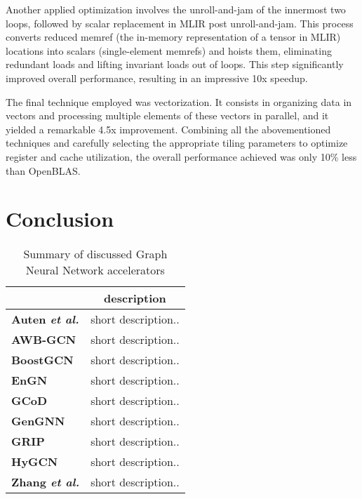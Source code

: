Another applied optimization involves the unroll-and-jam of the innermost two loops, followed by scalar replacement in MLIR post unroll-and-jam.
This process converts reduced memref (the in-memory representation of a tensor in MLIR) locations into scalars (single-element memrefs) and hoists them, eliminating redundant loads and lifting invariant loads out of loops.
This step significantly improved overall performance, resulting in an impressive 10x speedup.

The final technique employed was vectorization.
It consists in organizing data in vectors and processing multiple elements of these vectors in parallel, and it yielded a remarkable 4.5x improvement.
Combining all the abovementioned techniques and carefully selecting the appropriate tiling parameters to optimize register and cache utilization, the overall performance achieved was only 10\% less than OpenBLAS.

\section{Conclusion}
\label{sec:relater-work-conclusion}


\begin{table}[H]
\centering
    \begin{tabular}{|p{8em} c|}
    \hline
     & \textbf{description}  \\
    \hline \hline
    \textbf{Auten \textit{et al.}} & short description..  \\
    \hline
    \textbf{AWB-GCN} & short description..  \\
    \hline
    \textbf{BoostGCN} & short description..  \\
    \hline
    \textbf{EnGN} & short description..  \\
    \hline
    \textbf{GCoD} & short description..  \\
    \hline
    \textbf{GenGNN} & short description..  \\
    \hline
    \textbf{GRIP} & short description..  \\
    \hline
    \textbf{HyGCN} & short description..  \\
    \hline
    \textbf{Zhang \textit{et al.}} & short description..  \\
    \hline
    \end{tabular}
    \\[10pt]
    \caption{Summary of discussed Graph Neural Network accelerators}
    \label{tab:accelerators-summary}
\end{table}